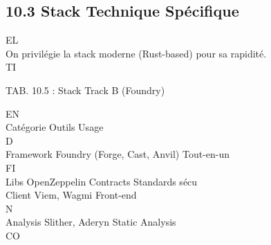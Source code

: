 \documentclass[12pt,landscape,a4paper]{article}
\begin{document}
\subsection{10.3 Stack Technique Spécifique}
\vspace{0.5em}
\vspace{0.5em}
\vspace{0.5em}
\vspace{0.5em}
EL\\
On privilégie la stack moderne (Rust-based) pour sa rapidité.\\
\vspace{0.5em}
\vspace{0.5em}
\vspace{0.5em}
\vspace{0.5em}
TI\\
\begin{center}\begin{tabular}TAB. 10.5 : Stack Track B (Foundry)\end{tabular}\end{center}
\vspace{0.5em}
\vspace{0.5em}
\vspace{0.5em}
\vspace{0.5em}
EN\\
Catégorie Outils                       Usage\\
\vspace{0.5em}
\vspace{0.5em}
\vspace{0.5em}
\vspace{0.5em}
D\\
Framework Foundry (Forge, Cast, Anvil) Tout-en-un\\
\vspace{0.5em}
\vspace{0.5em}
\vspace{0.5em}
\vspace{0.5em}
FI\\
Libs      OpenZeppelin Contracts       Standards sécu\\
Client    Viem, Wagmi                  Front-end\\
\vspace{0.5em}
N\\
Analysis  Slither, Aderyn              Static Analysis\\
CO\\
\vspace{0.5em}
\end{document}
